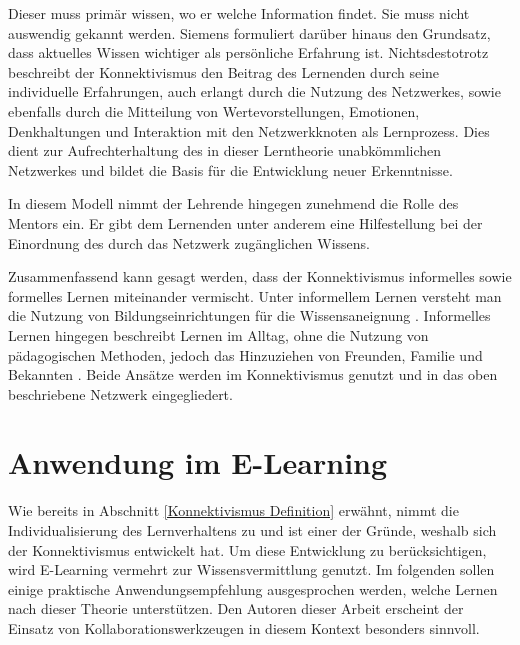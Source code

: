 \label{RolleLernender}
Dieser muss primär wissen, wo er welche Information findet. Sie muss nicht auswendig gekannt werden. Siemens formuliert darüber hinaus den Grundsatz, dass aktuelles Wissen wichtiger als persönliche Erfahrung ist. Nichtsdestotrotz beschreibt der Konnektivismus den Beitrag des Lernenden durch seine individuelle Erfahrungen, auch erlangt durch die Nutzung des Netzwerkes, sowie ebenfalls durch die Mitteilung von Wertevorstellungen, Emotionen, Denkhaltungen und Interaktion mit den Netzwerkknoten als Lernprozess. Dies dient zur Aufrechterhaltung des in dieser Lerntheorie unabkömmlichen Netzwerkes und bildet die Basis für die Entwicklung neuer Erkenntnisse.\cite[S. 49f.]{Kuhlmann.2008}

In diesem Modell nimmt der Lehrende hingegen zunehmend die Rolle des Mentors ein. Er gibt dem Lernenden unter anderem eine Hilfestellung bei der Einordnung des durch das Netzwerk zugänglichen Wissens.\cite[S. 49]{Kuhlmann.2008}

Zusammenfassend kann gesagt werden, dass der Konnektivismus informelles sowie formelles Lernen miteinander vermischt. Unter informellem Lernen versteht man die Nutzung von Bildungseinrichtungen für die Wissensaneignung \cite[S. 75]{Hellmer.2007}. Informelles Lernen hingegen beschreibt Lernen im Alltag, ohne die Nutzung von pädagogischen Methoden, jedoch das Hinzuziehen von Freunden, Familie und Bekannten \cite[S. 76]{Hellmer.2007}. Beide Ansätze werden im Konnektivismus genutzt und in das oben beschriebene Netzwerk eingegliedert. \cite[S. 50]{Kuhlmann.2008} %

\section{Anwendung im E-Learning}
Wie bereits in Abschnitt \ref{Konnektivismus Definition} erwähnt, nimmt die Individualisierung des Lernverhaltens zu und ist einer der Gründe, weshalb sich der Konnektivismus entwickelt hat. Um diese Entwicklung zu berücksichtigen, wird E-Learning vermehrt zur Wissensvermittlung genutzt. \cite[S. 47f.]{Kuhlmann.2008} Im folgenden sollen einige praktische Anwendungsempfehlung ausgesprochen werden, welche Lernen nach dieser Theorie unterstützen. Den Autoren dieser Arbeit erscheint der Einsatz von Kollaborationswerkzeugen in diesem Kontext besonders sinnvoll. %

